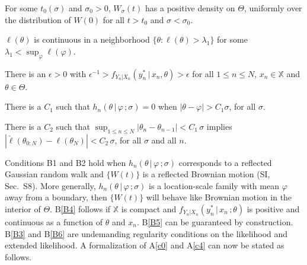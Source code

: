 \documentclass{pnastwo}\usepackage[]{graphicx}\usepackage[]{color}
\newcommand\SupSecBiBii{S8}
\newcommand\leveli{{\lambda_1}}
\newcommand\given{{\, | \,}}
\newcommand\giventh{\,;}
\newcommand\lik{\ell}
\newcommand\Xspace{{\mathbb X}}
\newcommand\Thetaspace{{\bbTheta}}
\newcommand\listA{A}
\newcommand\listB{B}
\newcommand\Ci{C_1}
\newcommand\Cii{C_2}
\newcommand{\bbTheta}{\Theta}
\newcommand{\conditionList}{ %
\setlength{\topsep}{1mm} \setlength{\itemsep}{0.5mm} \setlength{\parsep}{0cm}}
\begin{document}
\begin{article}
\begin{list}{(\listB{})}{\conditionList}
\item\label{B1b} For some $t_0(\sigma)$ and $\sigma_0>0$, $W_\sigma(t)$ has a positive density on $\Thetaspace$, uniformly over the distribution of $W(0)$ for all $t>t_0$ and $\sigma<\sigma_0$.

\item\label{B3} $\lik(\theta)$ is continuous in a neighborhood $\{\theta:\lik(\theta)>\leveli\}$ for some $\leveli<\sup_\varphi\lik(\varphi)$.
\item\label{B4} There is an $\epsilon>0$ with $\epsilon^{-1}>f_{Y_n|X_n}(y^*_n\given x_n,\theta)>\epsilon$ for all $1\le n\le N$, $x_n\in\Xspace$ and $\theta\in\Thetaspace$.
\item\label{B5} There is a $\Ci$ such that $h_n(\theta\given\varphi\giventh\sigma)=0$ when $|\theta-\varphi|>\Ci\sigma$, for all $\sigma$.
\item\label{B6} There is a $\Cii$ such that $\sup_{1\le n \le N}|\theta_n-\theta_{n-1}|<\Ci\,\sigma$ implies
$|\breve\lik(\theta_{0:N})-\lik(\theta_N)| < \Cii\, \sigma$, for all $\sigma$ and all $n$. 
\end{list}
Conditions B1 and B2 hold when $h_n(\theta\given\varphi\giventh\sigma)$ corresponds to a reflected Gaussian random walk and $\{W(t)\}$ is a reflected Brownian motion (SI, Sec.~\SupSecBiBii).
More generally, $h_n(\theta\given\varphi\giventh\sigma)$ is a location-scale family with mean $\varphi$ away from a boundary, then $\{W(t)\}$ will behave like Brownian motion in the interior of $\Thetaspace$.
\listB\ref{B4} follows if $\Xspace$ is compact and $f_{Y_n|X_n}(y^*_n\given x_n\giventh\theta)$ is positive and continuous as a function of $\theta$ and $x_n$.
\listB\ref{B5} can be guaranteed by construction.
\listB\ref{B3} and \listB\ref{B6} are undemanding regularity conditions on the likelihood and extended likelihood. A formalization of \listA\ref{c0} and \listA\ref{c4} can now be stated as follows.




\end{article}
\end{document}
